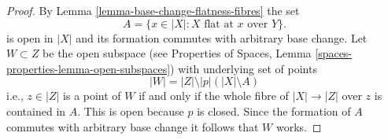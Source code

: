 \documentclass[10pt,a4paper]{amsart}
\theoremstyle{plain}
\theoremstyle{definition}
\theoremstyle{remark}
\numberwithin{equation}{subsection}
\begin{document}
\begin{proof}
By Lemma \ref{lemma-base-change-flatness-fibres}
the set
$$
A = \{x \in |X| : X\text{ flat at }x \text{ over }Y\}.
$$
is open in $|X|$ and its formation commutes with arbitrary base
change. Let $W \subset Z$ be the open subspace
(see
Properties of Spaces, Lemma
\ref{spaces-properties-lemma-open-subspaces})
with underlying set of points
$$
|W| = |Z| \setminus |p|\left(|X| \setminus A\right)
$$
i.e., $z \in |Z|$ is a point of $W$ if and only if the whole fibre
of $|X| \to |Z|$ over $z$ is contained in $A$. This is open because
$p$ is closed. Since the formation of $A$ commutes with arbitrary
base change it follows that $W$ works.
\end{proof}
\end{document}
